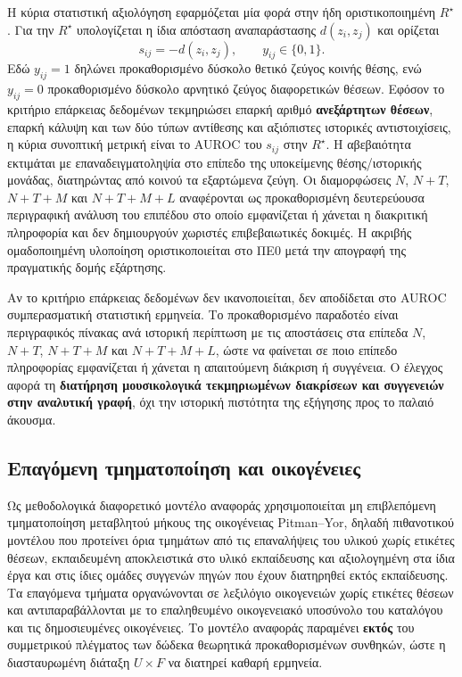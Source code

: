 \documentclass[11pt,a4paper]{article}
\begin{document}
Η κύρια στατιστική αξιολόγηση εφαρμόζεται μία φορά στην ήδη οριστικοποιημένη $R^\star$. Για την $R^\star$ υπολογίζεται η ίδια απόσταση αναπαράστασης $d(z_i,z_j)$ και ορίζεται
\[
s_{ij}=-d(z_i,z_j),\qquad y_{ij}\in\{0,1\}.
\]
Εδώ $y_{ij}=1$ δηλώνει προκαθορισμένο δύσκολο θετικό ζεύγος κοινής θέσης, ενώ $y_{ij}=0$ προκαθορισμένο δύσκολο αρνητικό ζεύγος διαφορετικών θέσεων.
Εφόσον το κριτήριο επάρκειας δεδομένων τεκμηριώσει επαρκή αριθμό \textbf{ανεξάρτητων θέσεων}, επαρκή κάλυψη και των δύο τύπων αντίθεσης και αξιόπιστες ιστορικές αντιστοιχίσεις, η κύρια συνοπτική μετρική είναι το AUROC του $s_{ij}$ στην $R^\star$. Η αβεβαιότητα εκτιμάται με επαναδειγματοληψία στο επίπεδο της υποκείμενης θέσης/ιστορικής μονάδας, διατηρώντας από κοινού τα εξαρτώμενα ζεύγη. Οι διαμορφώσεις $N$, $N{+}T$, $N{+}T{+}M$ και $N{+}T{+}M{+}L$ αναφέρονται ως προκαθορισμένη δευτερεύουσα περιγραφική ανάλυση του επιπέδου στο οποίο εμφανίζεται ή χάνεται η διακριτική πληροφορία και δεν δημιουργούν χωριστές επιβεβαιωτικές δοκιμές. Η ακριβής ομαδοποιημένη υλοποίηση οριστικοποιείται στο ΠΕ0 μετά την απογραφή της πραγματικής δομής εξάρτησης.

Αν το κριτήριο επάρκειας δεδομένων δεν ικανοποιείται, δεν αποδίδεται στο AUROC συμπερασματική στατιστική ερμηνεία. Το προκαθορισμένο παραδοτέο είναι περιγραφικός πίνακας ανά ιστορική περίπτωση με τις αποστάσεις στα επίπεδα $N$, $N{+}T$, $N{+}T{+}M$ και $N{+}T{+}M{+}L$, ώστε να φαίνεται σε ποιο επίπεδο πληροφορίας εμφανίζεται ή χάνεται η απαιτούμενη διάκριση ή συγγένεια. Ο έλεγχος αφορά τη \textbf{διατήρηση μουσικολογικά τεκμηριωμένων διακρίσεων και συγγενειών στην αναλυτική γραφή}, όχι την ιστορική πιστότητα της εξήγησης προς το παλαιό άκουσμα.

\subsection{Επαγόμενη τμηματοποίηση και οικογένειες}\label{sec:induced-segmentation}

Ως μεθοδολογικά διαφορετικό μοντέλο αναφοράς χρησιμοποιείται μη επιβλεπόμενη τμηματοποίηση μεταβλητού μήκους της οικογένειας Pitman--Yor, δηλαδή πιθανοτικού μοντέλου που προτείνει όρια τμημάτων από τις επαναλήψεις του υλικού χωρίς ετικέτες θέσεων, εκπαιδευμένη αποκλειστικά στο υλικό εκπαίδευσης και αξιολογημένη στα ίδια έργα και στις ίδιες ομάδες συγγενών πηγών που έχουν διατηρηθεί εκτός εκπαίδευσης. Τα επαγόμενα τμήματα οργανώνονται σε λεξιλόγιο οικογενειών χωρίς ετικέτες θέσεων και αντιπαραβάλλονται με το επαληθευμένο οικογενειακό υποσύνολο του καταλόγου και τις δημοσιευμένες οικογένειες. Το μοντέλο αναφοράς παραμένει \textbf{εκτός} του συμμετρικού πλέγματος των δώδεκα θεωρητικά προκαθορισμένων συνθηκών, ώστε η διασταυρωμένη διάταξη \(U\times F\) να διατηρεί καθαρή ερμηνεία.
\end{document}
